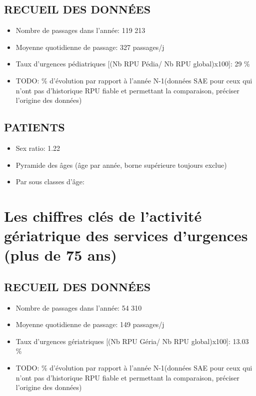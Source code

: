\documentclass[]{article}
\begin{document}
\subsection{RECUEIL DES DONNÉES}\label{recueil-des-donnees-1}

\begin{itemize}
\itemsep1pt\parskip0pt
\item
  Nombre de passages dans l'année: 119 213
\item
  Moyenne quotidienne de passage: 327 passages/j
\item
  Taux d'urgences pédiatriques {[}(Nb RPU Pédia/ Nb RPU global)x100{]}:
  29 \%
\item
  TODO: \% d'évolution par rapport à l'année N-1(données SAE pour ceux
  qui n'ont pas d'historique RPU fiable et permettant la comparaison,
  préciser l'origine des données)
\end{itemize}

\subsection{PATIENTS}\label{patients-1}

\begin{itemize}
\itemsep1pt\parskip0pt
\item
  Sex ratio: 1.22
\item
  Pyramide des âges (âge par année, borne supérieure toujours exclue)
\item
  Par sous classes d'âge:
\end{itemize}

\section{Les chiffres clés de l'activité gériatrique des services
d'urgences (plus de 75
ans)}\label{les-chiffres-cles-de-lactivite-geriatrique-des-services-durgences-plus-de-75-ans}

\subsection{RECUEIL DES DONNÉES}\label{recueil-des-donnees-2}

\begin{itemize}
\itemsep1pt\parskip0pt
\item
  Nombre de passages dans l'année: 54 310
\item
  Moyenne quotidienne de passage: 149 passages/j
\item
  Taux d'urgences gériatriques {[}(Nb RPU Géria/ Nb RPU global)x100{]}:
  13.03 \%
\item
  TODO: \% d'évolution par rapport à l'année N-1(données SAE pour ceux
  qui n'ont pas d'historique RPU fiable et permettant la comparaison,
  préciser l'origine des données)
\end{itemize}
\end{document}

